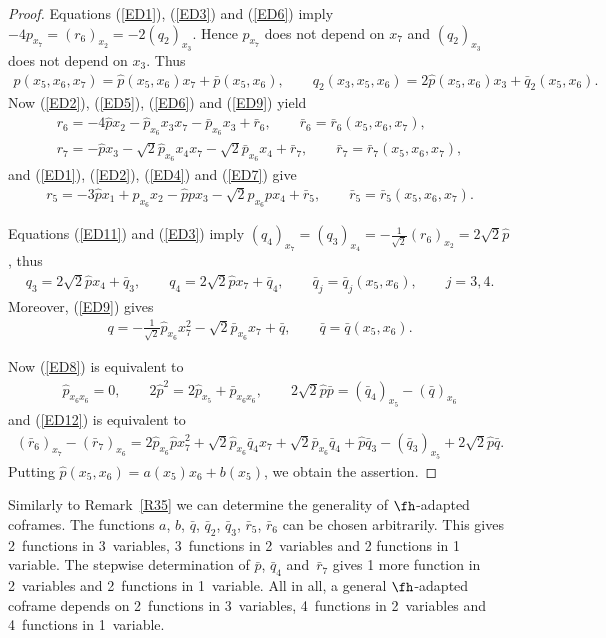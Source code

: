 \begin{proof}
Equations (\ref{ED1}), (\ref{ED3}) and (\ref{ED6}) imply $-4 p_{x_7}=(r_6)_{x_2}=-2(q_2)_{x_3}$. Hence $p_{x_7}$ does not depend on $x_7$ and $(q_2)_{x_3}$ does not depend on $x_3$. Thus
\begin{gather*}p(x_5,x_6,x_7)=\hat p(x_5,x_6)x_7+\bar p(x_5,x_6), \qquad q_2(x_3,x_5,x_6)=2\hat p(x_5,x_6)x_3 +\bar q_2(x_5,x_6).\end{gather*}
Now (\ref{ED2}), (\ref{ED5}), (\ref{ED6}) and (\ref{ED9}) yield
\begin{gather*}
r_6 = -4 \hat px_2-\hat p_{x_6} x_3 x_7 -\bar p_{x_6} x_3 +\bar r_6,\qquad \bar r_6=\bar r_6(x_5,x_6,x_7),\\
r_7 = -\hat p x_3-\sqrt 2 \hat p_{x_6} x_4x_7-\sqrt 2\bar p_{x_6} x_4 +\bar r_7, \qquad \bar r_7=\bar r_7(x_5,x_6,x_7),
\end{gather*}
and (\ref{ED1}), (\ref{ED2}), (\ref{ED4}) and (\ref{ED7}) give
\begin{gather*} r_5= -3\hat p x_1+p_{x_6}x_2-\hat ppx_3-\sqrt2 p_{x_6}px_4+\bar r_5,\qquad \bar r_5=\bar r_5(x_5,x_6,x_7).\end{gather*}

Equations (\ref{ED11}) and (\ref{ED3}) imply
 $(q_4)_{x_7}=(q_3)_{x_4}=-\frac 1{\sqrt2} (r_6)_{x_2}=2\sqrt 2 \hat p$, thus
\begin{gather*} q_3=2\sqrt 2 \hat px_4+\bar q_3,\qquad q_4=2\sqrt 2 \hat p x_7 +\bar q_4, \qquad \bar q_j=\bar q_j(x_5,x_6),\qquad j=3,4 .\end{gather*}
Moreover, (\ref{ED9}) gives
\begin{gather*}q= -\tfrac1{\sqrt 2} \hat p_{x_6} x_7^2-\sqrt 2 \bar p_{x_6}x_7+\bar q,\qquad \bar q=\bar q(x_5,x_6). \end{gather*}

Now (\ref{ED8}) is equivalent to
\begin{gather*}\hat p_{x_6 x_6}=0,\qquad 2\hat p^2=2\hat p_{x_5}+\bar p_{x_6 x_6}, \qquad
2\sqrt 2\hat p\bar p=(\bar q_4)_{x_5}-(\bar q)_{x_6}\end{gather*}
and (\ref{ED12}) is equivalent to
\begin{gather*}(\bar r_6)_{x_7}-(\bar r_7)_{x_6}=2\hat p_{x_6}\hat px_7^2+\sqrt2\hat p_{x_6}\bar q_4x_7+\sqrt2 \bar p_{x_6} \bar q_4+\hat p\bar q_3-(\bar q_3)_{x_5}+2\sqrt2 \hat p\bar q.\end{gather*}
Putting $\hat p(x_5,x_6)=a(x_5)x_6+b(x_5)$, we obtain the assertion.
\end{proof}
\begin{Remark}\label{R38} Similarly to Remark~\ref{R35} we can determine the generality of $\fh$-adapted coframes. The functions $a$, $b$, $\bar q$, $\bar q_2$, $\bar q_3$, $\bar r_5$, $\bar r_6 $ can be chosen arbitrarily. This gives 2~functions in 3~variables, 3~functions in 2~variables and 2 functions in 1 variable. The stepwise determination of $\bar p$, $\bar q_4$ and~$\bar r_7$ gives 1 more function in 2~variables and 2~functions in 1~variable. All in all, a general $\fh$-adapted coframe depends on 2~functions in 3~variables, 4~functions in 2~variables and 4~functions in 1~variable.
\end{Remark}
